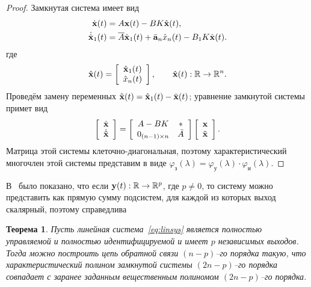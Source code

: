 \documentclass[a4paper,14pt]{article}
\newtheorem{theorem}{Теорема}
\theoremstyle{definition}
\begin{document}
\begin{proof}
  Замкнутая система имеет вид
  \begin{equation*}
    \begin{aligned}
      \dot{\vb{x}}(t) &= A \vb{x}(t) - BK \hat{\vb{x}}(t), \\
      \dot{\hat{\vb{x}}}_1(t) &= \overline{A} \hat{\vb{x}}_1(t) + \bar{\vb{a}}_n \hat{x}_n(t) - B_1 K \hat{\vb{x}}(t).
    \end{aligned}
  \end{equation*}
  где
  \begin{equation*}
    \hat{\vb{x}}(t) =
    \left[
      \begin{array}{c}
        \hat{\vb{x}}_1(t) \\
        \hat{x}_n(t)
      \end{array}
      \right], \qquad \hat{\vb{x}}(t): \mathbb{R} \to \mathbb{R}^n.
  \end{equation*}
  Проведём замену переменных $\tilde{\vb{x}}(t) = \hat{\vb{x}}_1(t) - \bar{\vb{x}}(t)$; уравнение замкнутой системы примет вид
  \begin{equation*}
    \left[
    \begin{array}{c}
      \dot{\vb{x}} \\
      \dot{\tilde{\vb{x}}}
    \end{array}
    \right]
    =
    \left[
    \begin{array}{cc}
      A - BK & \ast \\
      0_{(n-1) \times n} & \bar{A}
    \end{array}
    \right]
    \left[
    \begin{array}{c}
      \vb{x} \\
      \tilde{\vb{x}}
    \end{array}
    \right].
  \end{equation*}
  Матрица этой системы клеточно-диагональная, поэтому характеристический многочлен этой системы представим в виде
  $\varphi_{\text{з}}(\lambda) = \varphi_{\text{у}}(\lambda) \cdot \varphi_{\text{и}}(\lambda)$.
\end{proof}

В~\cite[с. 286]{Andreev1976} было показано, что если $\vb{y}(t) : \mathbb{R} \to \mathbb{R}^p$, где $p \neq 0$, то
систему можно представить как прямую сумму подсистем, для каждой из которых выход скалярный, поэтому справедлива
\begin{theorem}
  Пусть линейная система~\eqref{eq:linsys} является полностью управляемой и полностью идентифицируемой и имеет $p$ независимых
  выходов. Тогда можно построить цепь обратной связи $(n-p)$--го порядка такую, что характеристический полином замкнутой системы
  $(2n-p)$--го порядка совпадает с заранее заданным вещественным полиномом $(2n-p)$--го порядка.
\end{theorem}
\end{document}
